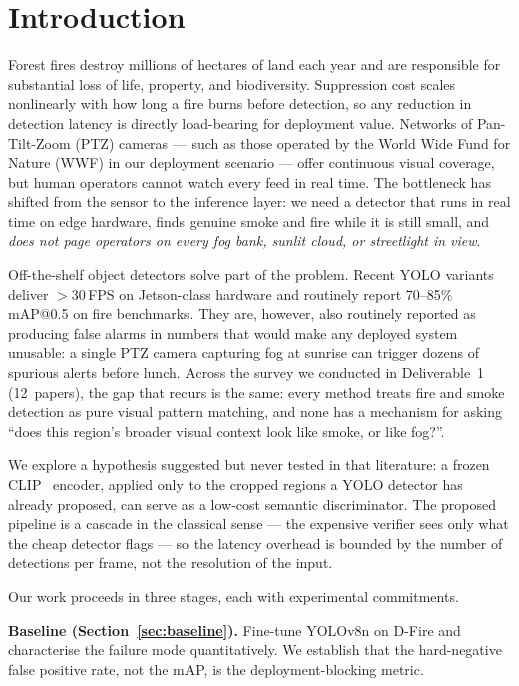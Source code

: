 \documentclass{article}
\begin{document}
\section{Introduction}
\label{sec:intro}

Forest fires destroy millions of hectares of land each year and are responsible
for substantial loss of life, property, and biodiversity. Suppression cost
scales nonlinearly with how long a fire burns before detection, so any reduction
in detection latency is directly load-bearing for deployment value. Networks of
Pan-Tilt-Zoom (PTZ) cameras --- such as those operated by the World Wide Fund
for Nature (WWF) in our deployment scenario --- offer continuous visual coverage,
but human operators cannot watch every feed in real time. The bottleneck has
shifted from the sensor to the inference layer: we need a detector that runs in
real time on edge hardware, finds genuine smoke and fire while it is still
small, and \emph{does not page operators on every fog bank, sunlit cloud, or
streetlight in view}.

Off-the-shelf object detectors solve part of the problem. Recent YOLO variants
deliver $>$30\,FPS on Jetson-class hardware and routinely report 70--85\%
mAP@0.5 on fire benchmarks. They are, however, also routinely reported as
producing false alarms in numbers that would make any deployed system
unusable: a single PTZ camera capturing fog at sunrise can trigger dozens of
spurious alerts before lunch. Across the survey we conducted in
Deliverable~1 (12~papers), the gap that recurs is the same: every method
treats fire and smoke detection as pure visual pattern matching, and none has a
mechanism for asking ``does this region's broader visual context look like
smoke, or like fog?''.

We explore a hypothesis suggested but never tested in that literature: a frozen
CLIP~\cite{clip} encoder, applied only to the cropped regions a YOLO detector
has already proposed, can serve as a low-cost semantic discriminator. The
proposed pipeline is a cascade in the classical sense --- the expensive verifier
sees only what the cheap detector flags --- so the latency overhead is bounded
by the number of detections per frame, not the resolution of the input.

Our work proceeds in three stages, each with experimental commitments.

\textbf{Baseline (Section~\ref{sec:baseline}).} Fine-tune YOLOv8n on D-Fire and
characterise the failure mode quantitatively. We establish that the
hard-negative false positive rate, not the mAP, is the deployment-blocking
metric.
\end{document}
